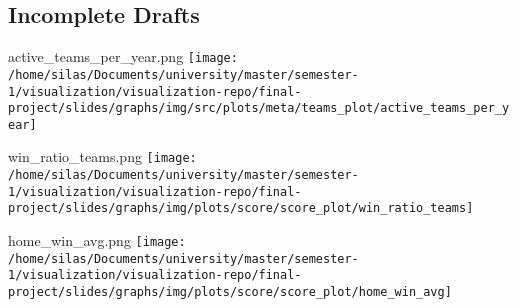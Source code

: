 \documentclass[pdf]{beamer}
\begin{document}
\subsection{Incomplete Drafts}
\begin{frame}{active\_teams\_per\_year.png}
	\centering
	\texttt{[image: /home/silas/Documents/university/master/semester-1/visualization/visualization-repo/final-project/slides/graphs/img/src/plots/meta/teams\_plot/active\_teams\_per\_year]}
\end{frame}
\begin{frame}{win\_ratio\_teams.png}
	\centering
	\texttt{[image: /home/silas/Documents/university/master/semester-1/visualization/visualization-repo/final-project/slides/graphs/img/plots/score/score\_plot/win\_ratio\_teams]}
\end{frame}
\begin{frame}{home\_win\_avg.png}
	\centering
	\texttt{[image: /home/silas/Documents/university/master/semester-1/visualization/visualization-repo/final-project/slides/graphs/img/plots/score/score\_plot/home\_win\_avg]}
\end{frame}
\end{document}
